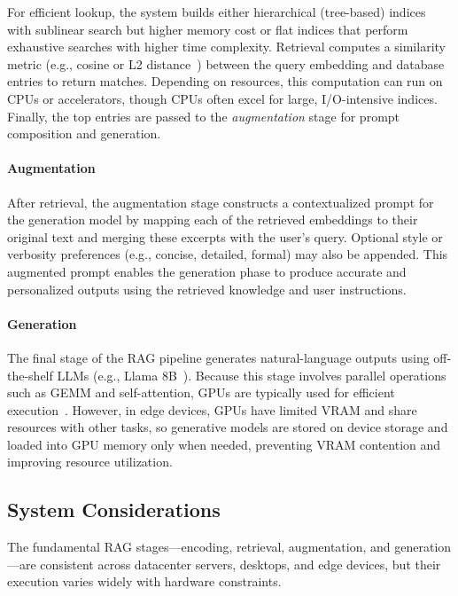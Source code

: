 For efficient lookup, the system builds either hierarchical (tree-based) indices with sublinear search but higher memory cost or flat indices that perform exhaustive searches with higher time complexity. Retrieval computes a similarity metric (e.g., cosine or L2 distance~\cite{l2}) between the query embedding and database entries to return \topk{} matches. Depending on resources, this computation can run on CPUs or accelerators, though CPUs often excel for large, I/O-intensive indices. Finally, the top entries are passed to the \emph{augmentation} stage for prompt composition and generation.

\noindent\paragraph{Augmentation}
\label{sec:BG:Augmentation}
After retrieval, the augmentation stage constructs a contextualized prompt for the generation model by mapping each of the \topk{} retrieved embeddings to their original text and merging these excerpts with the user’s query. Optional style or verbosity preferences (e.g., concise, detailed, formal) may also be appended. This augmented prompt enables the generation phase to produce accurate and personalized outputs using the retrieved knowledge and user instructions.

\noindent\paragraph{Generation}
\label{sec:BG:Generation}
The final stage of the RAG pipeline generates natural-language outputs using off-the-shelf LLMs (e.g., Llama 8B~\cite{llama_3_1_8b_instruct}). Because this stage involves parallel operations such as GEMM and self-attention, GPUs are typically used for efficient execution~\cite{attention_gpu}. However, in edge devices, GPUs have limited VRAM and share resources with other tasks, so generative models are stored on device storage and loaded into GPU memory only when needed, preventing VRAM contention and improving resource utilization. 

\subsection{System Considerations}
\label{sec:classical_pipeline}
The fundamental RAG stages—encoding, retrieval, augmentation, and generation—are consistent across datacenter servers, desktops, and edge devices, but their execution varies widely with hardware constraints.

